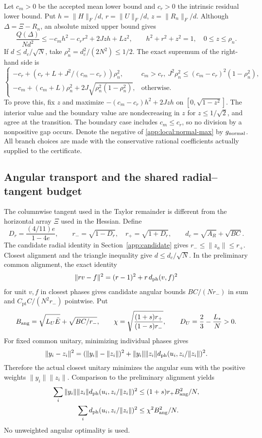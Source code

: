 Let $c_m>0$ be the accepted mean lower bound and $c_r>0$ the intrinsic
residual lower bound. Put
$h=\|H\|_F/d$, $r=\|U\|_F/d$, $z=\|R_n\|_F/d$.
Although $\Delta=\Xi-R_n$, an absolute mixed upper bound gives
\begin{equation}\label{app:local:normal-optimization}
 \frac{Q(\Delta)}{Nd^2}
 \le-c_mh^2-c_rr^2+2Jzh+Lz^2,\qquad
 h^2+r^2+z^2=1,\quad 0\le z\le\rho_n .
\end{equation}
If $d\le d_c/\sqrt N$, take $\rho_n^2=d_c^2/(2N^2)\le1/2$.
The exact supremum of the right-hand side is
\begin{equation}\label{app:local:normal-max}
 \begin{cases}
 -c_r+(c_r+L+J^2/(c_m-c_r))\rho_n^2,
 &c_m>c_r,\ J^2\rho_n^2\le(c_m-c_r)^2(1-\rho_n^2),\\
 -c_m+(c_m+L)\rho_n^2+2J\sqrt{\rho_n^2(1-\rho_n^2)},
 &\text{otherwise}.
 \end{cases}
\end{equation}
To prove this, fix $z$ and maximize
$-(c_m-c_r)h^2+2Jzh$ on $[0,\sqrt{1-z^2}]$.
The interior value and the boundary value are nondecreasing in $z$
for $z\le1/\sqrt2$, and agree at the transition.
The boundary case includes $c_m\le c_r$, so no division by a nonpositive
gap occurs. Denote the negative of \eqref{app:local:normal-max} by
$g_{\rm normal}$. All branch choices are made with the conservative
rational coefficients actually supplied to the certificate.

\subsection{Angular transport and the shared radial--tangent budget}
\label{app:local:angular}

The columnwise tangent used in the Taylor remainder is different from
the horizontal array $\Xi$ used in the Hessian. Define
\[
 D_r=\frac{(4/11)e}{1-4e},\qquad r_-=\sqrt{1-D_r},\quad
 r_+=\sqrt{1+D_r},\qquad d_c=\sqrt{A_R}+\sqrt{BC}.
\]
The candidate radial identity in Section~\ref{app:candidate} gives
$r_-\le\|z_a\|\le r_+$. Closest alignment and the triangle inequality
give $d\le d_c/\sqrt N$.
In the preliminary common alignment, the exact identity
\[
 \|rv-f\|^2=(r-1)^2+r\,d_{\rm ph}(v,f)^2
\]
for unit $v,f$ in closest phases gives candidate angular bounds
$BC/(Nr_-)$ in sum and $C_{\mathrm{pt}}C/(N^2r_-)$ pointwise. Put
\[
 B_{\rm ang}=\sqrt{L_U\bar E}+\sqrt{BC/r_-},\qquad
 \chi=\sqrt{\frac{(1+s)r_+}{(1-s)r_-}},\qquad
 D_U=\frac23-\frac{L_*}{N}>0.
\]
For fixed common unitary, minimizing individual phases gives
\[
 \|y_i-z_i\|^2=(\|y_i\|-\|z_i\|)^2+
 \|y_i\|\|z_i\|d_{\rm ph}(u_i,z_i/\|z_i\|)^2.
\]
Therefore the actual closest unitary minimizes the angular sum with
the positive weights $\|y_i\|\|z_i\|$. Comparison to the preliminary
alignment yields
\begin{align}
 \sum_i\|y_i\|\|z_i\|d_{\rm ph}(u_i,z_i/\|z_i\|)^2
 &\le (1+s)r_+B_{\rm ang}^2/N,\label{app:local:weighted-angle}\\
 \sum_i d_{\rm ph}(u_i,z_i/\|z_i\|)^2
 &\le\chi^2B_{\rm ang}^2/N. \nonumber
\end{align}
No unweighted angular optimality is used.

